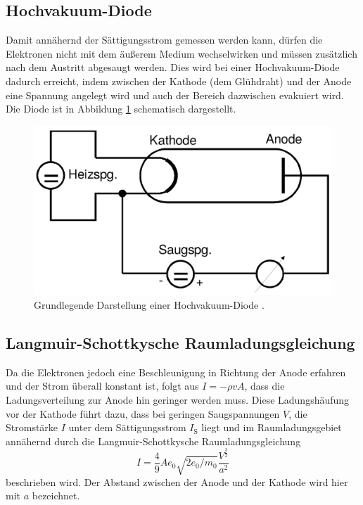 \subsection{Hochvakuum-Diode}
Damit annähernd der Sättigungsstrom gemessen werden kann, dürfen die Elektronen nicht mit dem äußerem Medium wechselwirken und müssen zusätzlich nach dem Austritt abgesaugt werden. Dies wird bei einer Hochvakuum-Diode dadurch erreicht, indem zwischen der Kathode (dem Glühdraht) und der Anode eine Spannung angelegt wird und auch der Bereich dazwischen evakuiert wird. Die Diode ist in Abbildung \ref{fig:Hochvakuum-Diode} schematisch dargestellt.
\begin{figure}
	\centering
	\includegraphics[width=\linewidth-100pt,height=\textheight-100pt,keepaspectratio]{content/Bilder/Hochvakuum-Diode.png}
	\caption{Grundlegende Darstellung einer Hochvakuum-Diode \cite{V504}.}
	\label{fig:Hochvakuum-Diode}
\end{figure}

\subsection{Langmuir-Schottkysche Raumladungsgleichung}
Da die Elektronen jedoch eine Beschleunigung in Richtung der Anode erfahren und der Strom überall konstant ist, folgt aus $I = -\rho v A $, dass die Ladungsverteilung zur Anode hin geringer werden muss. Diese Ladungshäufung vor der Kathode führt dazu, dass bei geringen Saugspannungen $V$, die Stromstärke $I$ unter dem Sättigungsstrom $I_\text{S}$ liegt und im Raumladungsgebiet annähernd durch die Langmuir-Schottkysche Raumladungsgleichung 
\begin{equation}
	I = \frac{4}{9} A e_0 \sqrt{2 e_0/m_0} \frac{V^\frac{3}{2}}{a^2} 
\end{equation} 
beschrieben wird. Der Abstand zwischen der Anode und der Kathode wird hier mit $a$ bezeichnet.

